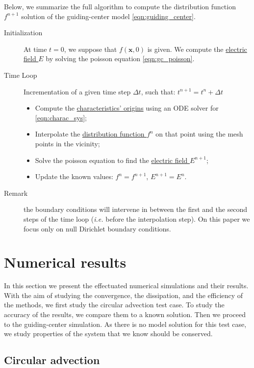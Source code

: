 \documentclass[proc]{edpsmath}
\begin{document}
Below, we summarize the full algorithm to compute the distribution function $f^{n+1}$ solution of the guiding-center model \eqref{eqn:guiding_center}.

\begin{description}
	\item[Initialization] At time $t=0$, we suppose that $f(\mathbf{x}, 0)$ is given. We compute the \underline{electric field $E$} by solving the poisson equation \eqref{eqn:gc_poisson}.
	\item[Time Loop] Incrementation of a given time step $\Delta t$, such that: $t^{n+1} = t^n + \Delta t$
		\begin{itemize}
		\item Compute the \underline{characteristics' origins} using an ODE solver for \eqref{eqn:charac_sys};
		\item Interpolate the \underline{distribution function $f^n$} on that point using the mesh points in the vicinity;
		\item Solve the poisson equation to find the \underline{electric field $E^{n+1}$};
		\item Update the known values: $f^n = f^{n+1}$, $E^{n+1}=E^n$.
		\end{itemize}
	\item[Remark] the boundary conditions will intervene in between the first and the second steps of the time loop (\emph{i.e.} before the interpolation step). On this paper we focus only on null Dirichlet boundary conditions.
\end{description}


\section{Numerical results}
\label{sec:results}
In this section we present the effectuated numerical simulations and their results. With the aim of studying the convergence, the dissipation, and the  efficiency of the methods, we first study the circular advection test case. To study the accuracy of the results, we compare them to a known solution. Then we proceed to the guiding-center simulation. As there is no model solution for this test case, we study properties of the system that we know should be conserved.


\subsection{Circular advection}
\end{document}
